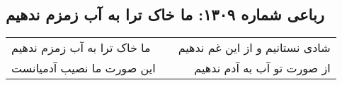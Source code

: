 \begin{center}
\section*{رباعی شماره ۱۳۰۹: ما خاک ترا به آب زمزم ندهیم}
\label{sec:1309}
\begin{longtable}{l p{0.5cm} r}
ما خاک ترا به آب زمزم ندهیم
&&
شادی نستانیم و از این غم ندهیم
\\
این صورت ما نصیب آدمیانست
&&
از صورت تو آب به آدم ندهیم
\\
\end{longtable}
\end{center}
